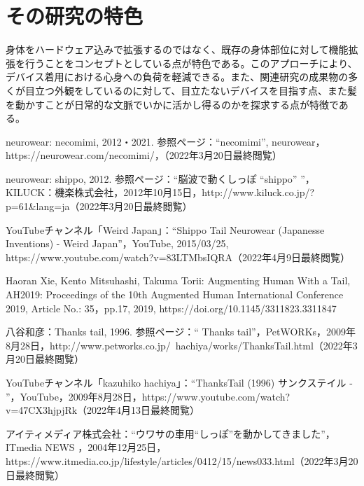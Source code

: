 \documentclass[a4paper]{jsarticle}
\begin{document}
\section{その研究の特色}
身体をハードウェア込みで拡張するのではなく、既存の身体部位に対して機能拡張を行うことをコンセプトとしている点が特色である。このアプローチにより、デバイス着用における心身への負荷を軽減できる。また、関連研究の成果物の多くが目立つ外観をしているのに対して、目立たないデバイスを目指す点、また髪を動かすことが日常的な文脈でいかに活かし得るのかを探求する点が特徴である。


\begin{thebibliography}{999}

\begin{flushleft}
  neurowear: necomimi, 2012・2021. 参照ページ：“necomimi”, neurowear，https://neurowear.com/necomimi/，（2022年3月20日最終閲覧）
\end{flushleft}

  neurowear: shippo, 2012. 参照ページ：“脳波で動くしっぽ “shippo” ”，KILUCK：機楽株式会社，2012年10月15日，http://www.kiluck.co.jp/?p=61\&lang=ja（2022年3月20日最終閲覧）
  
 \begin{flushleft}
 YouTubeチャンネル「Weird Japan」：“Shippo Tail Neurowear (Japanesse Inventions) - Weird Japan”，YouTube, 2015/03/25, https://www.youtube.com/watch?v=83LTMbsIQRA（2022年4月9日最終閲覧）
 \end{flushleft}

  Haoran Xie, Kento Mitsuhashi, Takuma Torii: Augmenting Human With a Tail, AH2019: Proceedings of the 10th Augmented Human International Conference 2019, Article No.: 35，pp.17, 2019, https://doi.org/10.1145/3311823.3311847

八谷和彦：Thanks tail, 1996. 参照ページ：“ Thanks tail”，PetWORKs，2009年8月28日，http://www.petworks.co.jp/~hachiya/works/ThanksTail.html（2022年3月20日最終閲覧）

YouTubeチャンネル「kazuhiko hachiya」：“ThanksTail (1996) サンクステイル - ”，YouTube，2009年8月28日，https://www.youtube.com/watch?v=47CX3hjpjRk（2022年4月13日最終閲覧）
  
\begin{flushleft}
アイティメディア株式会社：“ウワサの車用“しっぽ”を動かしてきました”， ITmedia NEWS ，2004年12月25日，https://www.itmedia.co.jp/lifestyle/articles/0412/15/news033.html（2022年3月20日最終閲覧）
\end{flushleft}


\end{thebibliography}
\end{document}
